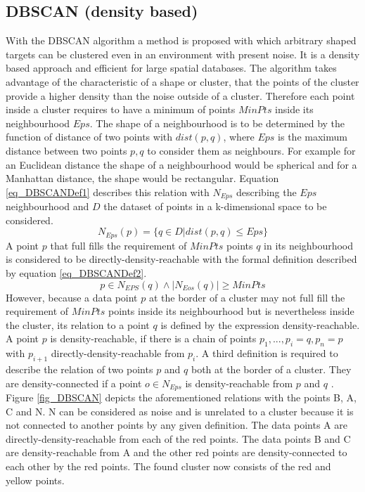 \subsection{DBSCAN (density based)} \label{DBSCAN}
With the \ac{DBSCAN} algorithm a method is proposed with which arbitrary shaped targets can be clustered even in an environment with present noise. It is a density based approach and efficient for large spatial databases. The algorithm takes advantage of the characteristic of a shape or cluster, that the points of the cluster provide a higher density than the noise outside of a cluster. Therefore each point inside a cluster requires to have a minimum of points $MinPts$ inside its neighbourhood $Eps$. The shape of a neighbourhood is to be determined by the function of distance of two points with $dist(p,q)$, where $Eps$ is the maximum distance between two points $p,q$ to consider them as neighbours. For example for an Euclidean distance the shape of a neighbourhood would be spherical and for a Manhattan distance, the shape would be rectangular. Equation \ref{eq_DBSCANDef1} describes this relation with $N_{Eps}$ describing the $Eps$ neighbourhood and $D$ the dataset of points in a k-dimensional space to be considered.
 \begin{equation}
\label{eq_DBSCANDef1}
N_{Eps}(p)= \{q\in D |dist(p,q) \leq Eps \}
\end{equation}
A point $p$ that full fills the requirement of $MinPts$ points $q$ in its neighbourhood is considered to be directly-density-reachable with the formal definition described by equation \ref{eq_DBSCANDef2}.
\begin{equation}
\label{eq_DBSCANDef2}
p \in N_{EPS}(q) \land |N_{Eos}(q)| \geq MinPts
\end{equation}
However, because a data point $p$ at the border of a cluster may not full fill the requirement of $MinPts$ points inside its neighbourhood but is nevertheless inside the cluster, its relation to a point $q$ is defined by the expression density-reachable. A point $p$ is density-reachable, if there is a chain of points $p_1,...,p_i= q, p_n=p$ with $p_{i+1}$ directly-density-reachable from $p_i$. A third definition is required to describe the relation of two points $p$ and $q$ both at the border of a cluster. They are density-connected if a point $o \in N_{Eps}$ is density-reachable from $p$ and $q$ \cite{DBSCAN} \cite{DBSCANRev}. Figure \ref{fig_DBSCAN} depicts the aforementioned relations with the points B, A, C and N. N can be considered as noise and is unrelated to a cluster because it is not connected to another points by any given definition. The data points A are directly-density-reachable from each of the red points. The data points B and C are density-reachable from A and the other red points are density-connected to each other by the red points. The found cluster now consists of the red and yellow points.

